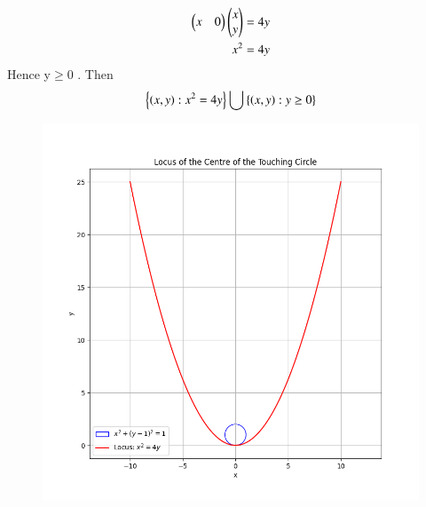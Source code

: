 \documentclass[journal]{IEEEtran}
\begin{document}
\begin{align}
\begin{pmatrix}x&0\end{pmatrix}\begin{pmatrix}x\\y\end{pmatrix}=4y \\
x^2=4y
\end{align}
Hence y$\geq$0 . Then
\begin{align}
    \left\{\left(x,y\right):x^2=4y\right\} \bigcup \left\{\left(x,y\right):y\geq0\right\}
\end{align}
\begin{figure}[h!]
   \centering
   \includegraphics[width=0.7\columnwidth]{figs/fig1.png}
	\caption{}
   \label{}
\end{figure}
\end{document}
